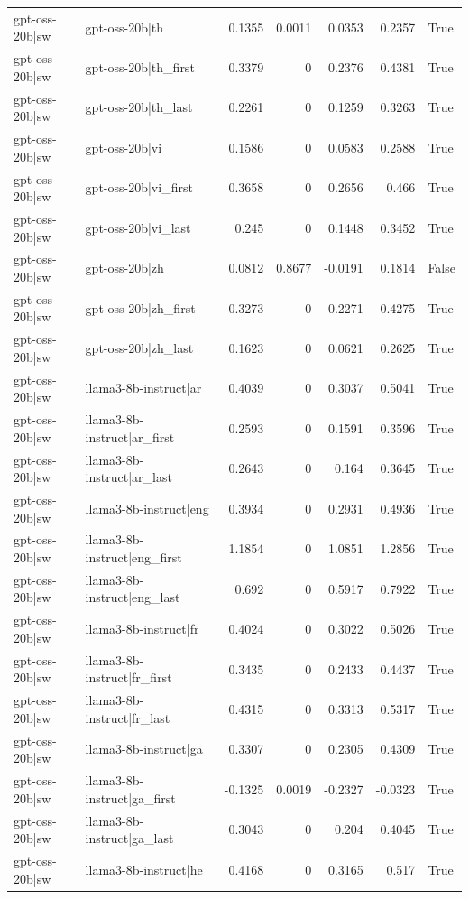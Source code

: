 \begin{table}
\begin{tabular}{l l r r r r l}
gpt-oss-20b|sw & gpt-oss-20b|th & 0.1355 & 0.0011 & 0.0353 & 0.2357 & True \\
gpt-oss-20b|sw & gpt-oss-20b|th_first & 0.3379 & 0 & 0.2376 & 0.4381 & True \\
gpt-oss-20b|sw & gpt-oss-20b|th_last & 0.2261 & 0 & 0.1259 & 0.3263 & True \\
gpt-oss-20b|sw & gpt-oss-20b|vi & 0.1586 & 0 & 0.0583 & 0.2588 & True \\
gpt-oss-20b|sw & gpt-oss-20b|vi_first & 0.3658 & 0 & 0.2656 & 0.466 & True \\
gpt-oss-20b|sw & gpt-oss-20b|vi_last & 0.245 & 0 & 0.1448 & 0.3452 & True \\
gpt-oss-20b|sw & gpt-oss-20b|zh & 0.0812 & 0.8677 & -0.0191 & 0.1814 & False \\
gpt-oss-20b|sw & gpt-oss-20b|zh_first & 0.3273 & 0 & 0.2271 & 0.4275 & True \\
gpt-oss-20b|sw & gpt-oss-20b|zh_last & 0.1623 & 0 & 0.0621 & 0.2625 & True \\
gpt-oss-20b|sw & llama3-8b-instruct|ar & 0.4039 & 0 & 0.3037 & 0.5041 & True \\
gpt-oss-20b|sw & llama3-8b-instruct|ar_first & 0.2593 & 0 & 0.1591 & 0.3596 & True \\
gpt-oss-20b|sw & llama3-8b-instruct|ar_last & 0.2643 & 0 & 0.164 & 0.3645 & True \\
gpt-oss-20b|sw & llama3-8b-instruct|eng & 0.3934 & 0 & 0.2931 & 0.4936 & True \\
gpt-oss-20b|sw & llama3-8b-instruct|eng_first & 1.1854 & 0 & 1.0851 & 1.2856 & True \\
gpt-oss-20b|sw & llama3-8b-instruct|eng_last & 0.692 & 0 & 0.5917 & 0.7922 & True \\
gpt-oss-20b|sw & llama3-8b-instruct|fr & 0.4024 & 0 & 0.3022 & 0.5026 & True \\
gpt-oss-20b|sw & llama3-8b-instruct|fr_first & 0.3435 & 0 & 0.2433 & 0.4437 & True \\
gpt-oss-20b|sw & llama3-8b-instruct|fr_last & 0.4315 & 0 & 0.3313 & 0.5317 & True \\
gpt-oss-20b|sw & llama3-8b-instruct|ga & 0.3307 & 0 & 0.2305 & 0.4309 & True \\
gpt-oss-20b|sw & llama3-8b-instruct|ga_first & -0.1325 & 0.0019 & -0.2327 & -0.0323 & True \\
gpt-oss-20b|sw & llama3-8b-instruct|ga_last & 0.3043 & 0 & 0.204 & 0.4045 & True \\
gpt-oss-20b|sw & llama3-8b-instruct|he & 0.4168 & 0 & 0.3165 & 0.517 & True \\

\end{tabular}
\end{table}

